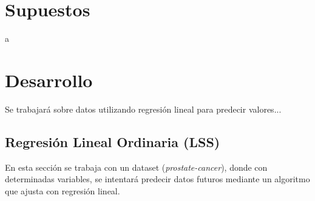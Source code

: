 \documentclass[10pt]{article}
\begin{document}
\section{Supuestos}

a\\

\section{Desarrollo}
Se trabajará sobre datos utilizando regresión lineal para predecir valores...

\subsection{Regresión Lineal Ordinaria (LSS)}

En esta sección se trabaja con un dataset (\textit{prostate-cancer}), donde con determinadas variables, se intentará predecir datos futuros mediante un algoritmo que ajusta con regresión lineal.
\end{document}

